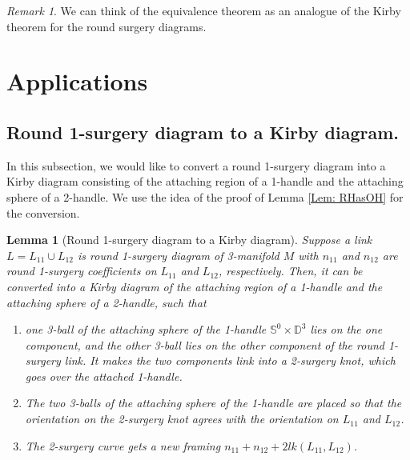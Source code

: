 \documentclass{amsart}
\theoremstyle{plain}
\newtheorem{lem}{Lemma}
\theoremstyle{remark}
\newtheorem{rem}{Remark}
\theoremstyle{definition}
\newcommand{\s}{\mathbb{S}}
\newcommand{\D}{\mathbb{D}}
\begin{document}
\begin{rem}
    We can think of the equivalence theorem as an analogue of the Kirby theorem for the round surgery diagrams. 
\end{rem}

\section{Applications}\label{Sec: Application}
\subsection{Round 1-surgery diagram to a Kirby diagram.}


In this subsection, we would like to convert a round 1-surgery diagram into a Kirby diagram consisting of the attaching region of a 1-handle and the attaching sphere of a 2-handle.  
We use the idea of the proof of Lemma \ref{Lem: RHasOH} for the conversion. 


\begin{lem}[Round 1-surgery diagram to a Kirby diagram]\label{Lem: R1SDtoOSD}
    Suppose a link $L=L_{11} \cup L_{12}$ is round 1-surgery diagram of 3-manifold $M$ with $n_{11}$ and $n_{12}$ are round 1-surgery coefficients on $L_{11}$ and $L_{12}$, respectively. Then, it can be converted into a Kirby diagram  of the attaching region of a 1-handle and the attaching sphere of a 2-handle, such that
        \begin{enumerate}
        \item one 3-ball of the attaching sphere of the 1-handle $\s^0\times\D^3$ lies on the one component, and the other 3-ball lies on the other component of the round 1-surgery link. It makes the two components link into a 2-surgery knot, which goes over the attached 1-handle. 
         \item The two 3-balls of the attaching sphere of the 1-handle are placed so that the orientation on the 2-surgery knot agrees with the orientation on $L_{11}$ and $L_{12}$.
        \item The 2-surgery curve gets a new framing $n_{11} + n_{12} + 2 lk(L_{11}, L_{12})$.
    \end{enumerate}
\end{lem}
\end{document}
